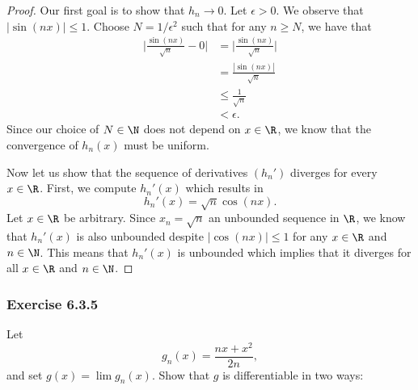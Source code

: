\begin{proof}
Our first goal is to show that \( h_n \to 0  \). Let \( \epsilon > 0  \). We observe that \( | \sin(nx)  | \leq 1   \). Choose \( N = 1 / \epsilon^2    \) such that for any \( n \geq N  \), we have that 
\begin{align*}
    \Big| \frac{ \sin(nx)  }{ \sqrt{ n }  } - 0  \Big| &= \Big| \frac{ \sin(nx)  }{ \sqrt{ n }  }  \Big|  \\
                                                       &= \frac{ | \sin (nx)  |  }{ \sqrt{ n }  } \\ 
                                                       &\leq \frac{ 1 }{ \sqrt{ n }  } \\
                                                       &< \epsilon.
\end{align*}
Since our choice of \( N \in \N  \) does not depend on \( x \in \R  \), we know that the convergence of \( h_n(x)  \) must be uniform. 

Now let us show that the sequence of derivatives \( (h_n') \) diverges for every \( x \in \R  \). First, we compute \( h_n'(x)  \) which results in
\[  h_n'(x) = \sqrt{ n } \cos(nx).  \]
Let \( x \in \R  \) be arbitrary. Since \( x_n = \sqrt{ n  }   \) an unbounded sequence in \( \R  \), we know that \( h_n'(x)  \) is also unbounded despite \( | \cos(nx)  | \leq 1  \) for any \( x \in \R  \) and \( n \in \N  \). This means that \( h_n'(x)  \) is  unbounded which implies that it diverges for all \( x \in \R  \) and \( n \in \N  \).
\end{proof}

\subsubsection{Exercise 6.3.5} Let 
\[  g_n(x) = \frac{ nx + x^2  }{ 2n } , \]
and set \( g(x) = \lim g_n(x)  \). Show that \( g  \) is differentiable in two ways:

